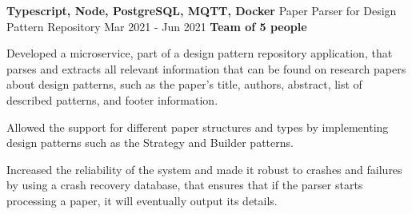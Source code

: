 \cventry
  {\textbf{Typescript, Node, PostgreSQL, MQTT, Docker}}
  {Paper Parser for Design Pattern Repository \href{https://github.com/EduRibeiro00/PatternParser-feup-asso}{\faExternalLink}} %
  {Mar 2021 - Jun 2021}
  {\textbf{Team of 5 people}}
  {
    \begin{cvitems} %
      \item {Developed a microservice, part of a design pattern repository application, that parses and extracts all relevant information that can be found on research papers about design patterns, such as the paper's title, authors, abstract, list of described patterns, and footer information.}
      \item {Allowed the support for different paper structures and types by implementing design patterns such as the Strategy and Builder patterns.}
      \item {Increased the reliability of the system and made it robust to crashes and failures by using a crash recovery database, that ensures that if the parser starts processing a paper, it will eventually output its details.}
    \end{cvitems}
  }
